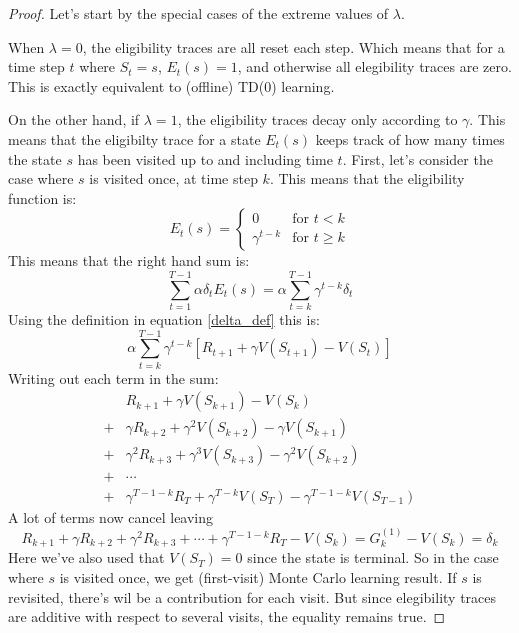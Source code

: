 \documentclass[12pt, a4paper]{article}
\numberwithin{equation}{section}
\begin{document}
\begin{proof}
Let's start by the special cases of the extreme values of $\lambda$.

When $\lambda=0$, the eligibility traces are all reset each step. Which means that for a time step $t$ where $S_t=s$, $E_t(s)=1$, and otherwise all elegibility traces are zero. This is exactly equivalent to (offline) TD(0) learning.

On the other hand, if $\lambda=1$, the eligibility traces decay only according to $\gamma$. This means that the eligibilty trace for a state $E_t(s)$ keeps track of how many times the state $s$ has been visited up to and including time $t$. First, let's consider the case where $s$ is visited once, at time step $k$. This means that the eligibility function is:
\begin{equation}
E_t(s)=\begin{cases}
0 & \textrm{for }t<k \\
\gamma^{t-k} & \textrm{for }t\ge k
\end{cases}
\end{equation}
This means that the right hand sum is:
\begin{equation}
\sum_{t=1}^{T-1}\alpha\delta_t E_t(s)=\alpha\sum_{t=k}^{T-1}\gamma^{t-k}\delta_t
\end{equation}
Using the definition in equation \ref{delta_def} this is:
\begin{equation}
\alpha\sum_{t=k}^{T-1}\gamma^{t-k}\left[R_{t+1}+\gamma V(S_{t+1})-V(S_t)\right]
\end{equation}
Writing out each term in the sum:
\begin{align}
&R_{k+1}+\gamma V(S_{k+1})-V(S_k)\\
+&\gamma R_{k+2}+\gamma^2 V(S_{k+2})-\gamma V(S_{k+1})\\
+&\gamma^2 R_{k+3}+\gamma^3 V(S_{k+3})-\gamma^2 V(S_{k+2})\\
+&\cdots\\
+&\gamma^{T-1-k} R_T+\gamma^{T-k}V(S_T)-\gamma^{T-1-k} V(S_{T-1})
\end{align}
A lot of terms now cancel leaving
\begin{equation}
R_{k+1}+\gamma R_{k+2}+\gamma^2 R_{k+3}+\cdots +\gamma^{T-1-k}R_T-V(S_k)=G^{(1)}_k-V(S_k)=\delta_k
\end{equation}
Here we've also used that $V(S_T)=0$ since the state is terminal. So in the case where $s$ is visited once, we get (first-visit) Monte Carlo learning result. If $s$ is revisited, there's wil be a contribution for each visit. But since elegibility traces are additive with respect to several visits, the equality remains true.


\end{proof}
\end{document}
